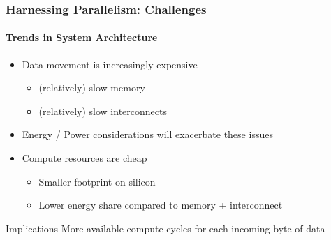 \begin{frame}[t]
\frametitle{Harnessing Parallelism: Challenges}
\framesubtitle{Trends in System Architecture}
    \begin{itemize}
        \item Data movement is increasingly expensive
            \begin{itemize}
                \item (relatively) slow memory
                \item (relatively) slow interconnects
            \end{itemize}
        \item Energy / Power considerations will exacerbate these issues
        \pause
        \item Compute resources are cheap
            \begin{itemize}
                \item Smaller footprint on silicon
                \item Lower energy share compared to memory + interconnect
            \end{itemize}
    \end{itemize}
    \pause
    \begin{block}{Implications}
       More available compute cycles for each incoming byte of data
    \end{block}
\end{frame}


